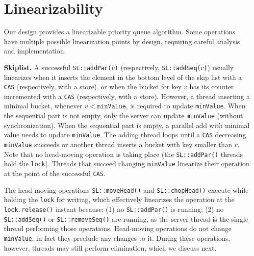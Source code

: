 \section{Linearizability}
\label{Sec-Linearizability}
 
Our design provides a linearizable priority queue algorithm. Some operations have multiple possible linearization points by design, requiring careful analysis and implementation.

\textbf{Skiplist.} A successful \texttt{SL::addPar($v$)} (respectively, \texttt{SL::addSeq($v$)}) usually linearizes when it inserts the element in the bottom level of the skip list with a \texttt{CAS} (respectively, with a store), or when the bucket for key $v$ has its counter incremented with a \texttt{CAS} (respectively, with a store). However, a thread inserting a minimal bucket, whenever $v < \mathtt{minValue}$, is required to update \texttt{minValue}. When the sequential part is not empty, only the server can update \texttt{minValue} (without synchronization). When the sequential part is empty, a parallel add with minimal value needs to update \texttt{minValue}.
The adding thread loops until a \texttt{CAS} decreasing \texttt{minValue} succeeds or another thread inserts a bucket with key smaller than $v$. Note that no head-moving operation is taking place (the \texttt{SL::addPar()} threads hold the \texttt{lock}). Threads that succeed changing \texttt{minValue} linearize their operation at the point of the successful \texttt{CAS}. 

The head-moving operations \texttt{SL::moveHead()} and \texttt{SL::chopHead()} execute while holding the \texttt{lock} for writing, which effectively linearizes the operation at the \texttt{lock.release()} instant because: (1) no \texttt{SL::addPar()} is running; (2) no \texttt{SL::addSeq()} or \texttt{SL::removeSeq()} are running, as the server thread is the single thread performing those operations. Head-moving operations do not change \texttt{minValue}, in fact they preclude any changes to it. During these operations, however, threads may still perform elimination, which we discuss next.

